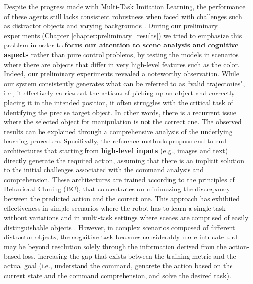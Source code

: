 Despite the progress made with Multi-Task Imitation Learning, the performance of these agents still lacks consistent robustness when faced with challenges such as distractor objects and varying backgrounds \cite{brohan2022rt}. During our preliminary experiments (Chapter \ref{chapter:preliminary_results}) we tried to emphasize this problem in order to \textbf{focus our attention to scene analysis and cognitive aspects} rather than pure control problems, by testing the models in scenarios where there are objects that differ in very high-level features such as the color. Indeed, our preliminary experiments revealed a noteworthy observation. While our system consistently generates what can be referred to as ``valid trajectories", i.e., it effectively carries out the actions of picking up an object and correctly placing it in the intended position, it often struggles with the critical task of identifying the precise target object. In other words, there is a recurrent issue where the selected object for manipulation is not the correct one.
\newline The observed results can be explained through a comprehensive analysis of the underlying learning procedure. Specifically, the reference methods \cite{dasari2021transformers_one_shot,mandi2022towards_more_generalizable_one_shot,brohan2022rt} propose end-to-end architectures that starting from \textbf{high-level inputs} (e.g., images and text) directly generate the required action, assuming that there is an implicit solution to the initial challenges associated with the command analysis and comprehension. These architectures are trained according to the principles of Behavioral Cloning (BC), that concentrates on minimazing the discrepancy between the predicted action and the correct one. This approach has exhibited effectiveness in simple scenarios where the robot has to learn a single task without variations \cite{zhang2018deep_vr_teleoperation,duan2017one_shot_il} and in multi-task settings where scenes are comprised of easily distinguishable objects \cite{dasari2021transformers_one_shot,mandi2022towards_more_generalizable_one_shot,brohan2022rt}. However, in complex scenarios composed of different distractor objects, the cognitive task becomes considerably more intricate and may be beyond resolution solely through the information derived from the action-based loss, increasing the gap that exists between the training metric and the actual goal (i.e., understand the command, genarete the action based on the current state and the command comprehension, and solve the desired task).
